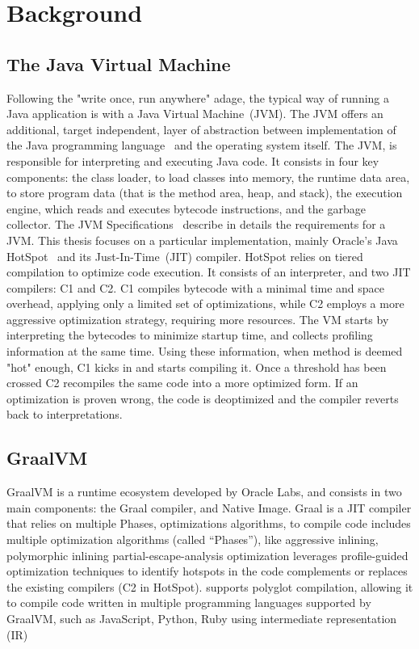 \chapter{Background}

\section{The Java Virtual Machine}
Following the "write once, run anywhere" adage, the typical way of running a Java application is with a Java Virtual Machine~(JVM).
The JVM offers an additional, target independent, layer of abstraction between implementation of 
the Java programming language~\cite{noauthor_java_nodate-2} and the operating system itself.
The JVM, is responsible for interpreting and executing Java code. It consists in four key components: 
the class loader, to load classes into memory, the runtime data area, to store program data (that is the method area, heap, and stack), the execution engine, which reads and executes bytecode instructions, and the garbage collector. The JVM Specifications~\cite{noauthor_java_nodate-1} describe in details the requirements for a JVM. 
This thesis focuses on a particular implementation, mainly Oracle's Java HotSpot~\cite{noauthor_hotspot_nodate} and its Just-In-Time~(JIT) compiler. 
HotSpot relies on tiered compilation to optimize code execution. It consists of an interpreter, and two JIT compilers: C1 and C2. 
C1 compiles bytecode with a minimal time and space overhead, applying only a limited set of optimizations, while C2 employs a more aggressive optimization strategy, requiring more resources.
The VM starts by interpreting the bytecodes to minimize startup time, and collects profiling information at the same time. Using these information, when method is deemed "hot" enough, C1 kicks in and starts compiling it. Once a threshold has been crossed C2 
recompiles the same code into a more optimized form. If an optimization is proven wrong, the code is 
deoptimized and the compiler reverts back to interpretations.  

\section{GraalVM}
GraalVM is a runtime ecosystem developed by Oracle Labs, and consists in two main components: the Graal compiler, and Native Image.
Graal is a JIT compiler that relies on multiple Phases, optimizations algorithms, to compile code 
includes multiple optimization algorithms (called “Phases”), like aggressive inlining, polymorphic inlining
 partial-escape-analysis optimization
 leverages profile-guided optimization techniques to identify hotspots in the code
complements or replaces the existing compilers (C2 in HotSpot).
 supports polyglot compilation, allowing it to compile code written in multiple programming languages supported by GraalVM, such as JavaScript, Python, Ruby using intermediate representation (IR)


